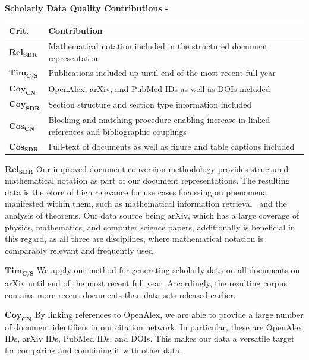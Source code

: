 \begin{infobox-progress}
      \textbf{Scholarly Data Quality Contributions - \cite{Saier2022ULITE,Saier2023unarXive}}\vspace{0.5em}

      \begin{tabular}{lp{10.9cm}}
        \toprule
        Crit. & Contribution \\
        \midrule
        $\mathbf{Rel_{SDR}}$ & Mathematical notation included in the structured document representation \\
        $\mathbf{Tim_{C/S}}$ & Publications included up until end of the most recent full year \\
        $\mathbf{Coy_{CN}}$ & OpenAlex, arXiv, and PubMed IDs as well as DOIs included \\
        $\mathbf{Coy_{SDR}}$ & Section structure and section type information included \\
        $\mathbf{Cos_{CN}}$ & Blocking and matching procedure enabling increase in linked references and bibliographic couplings \\
        $\mathbf{Cos_{SDR}}$ & Full-text of documents as well as figure and table captions included \\
        \bottomrule
      \end{tabular}
\end{infobox-progress}

$\mathbf{Rel_{SDR}}$ Our improved document conversion methodology provides structured mathematical notation as part of our document representations. The resulting data is therefore of high relevance for use cases focussing on phenomena manifested within them, such as mathematical information retrieval~\cite{semeval22_task12} and the analysis of theorems. Our data source being arXiv, which has a large coverage of physics, mathematics, and computer science papers, additionally is beneficial in this regard, as all three are disciplines, where mathematical notation is comparably relevant and frequently used.

$\mathbf{Tim_{C/S}}$ We apply our method for generating scholarly data on all documents on arXiv until end of the most recent full year. Accordingly, the resulting corpus contains more recent documents than data sets released earlier.

$\mathbf{Coy_{CN}}$ By linking references to OpenAlex, we are able to provide a large number of document identifiers in our citation network. In particular, these are OpenAlex IDs, arXiv IDs, PubMed IDs, and DOIs. This makes our data a versatile target for comparing and combining it with other data.

